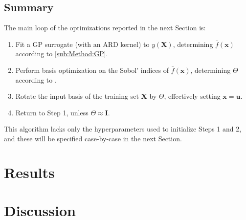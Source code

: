 \documentclass[preprint,12pt]{elsarticle}
\newcommand*{\M}[1]{\ensuremath{#1}\xspace}
\newcommand*{\vr}[1]{\M{\mathbf{#1}}}
\begin{document}
        \subsection{Summary} \label{sub:Method:Summary}
            The main loop of the optimizations reported in the next Section is:
            \begin{enumerate}
                \item Fit a GP surrogate (with an ARD kernel) to $y(\vr{X})$, determining $\bar{f}(\vr{x})$ according to \cref{sub:Method:GP}.
                \item Perform basis optimization on the Sobol' indices of $\bar{f}(\vr{x})$, determining $\Theta$ according to .
                \item Rotate the input basis of the training set $\vr{X}$ by $\Theta$, effectively setting $\vr{x}=\vr{u}$.
                \item Return to Step 1, unless $\Theta \approx \vr{I}$.
            \end{enumerate}
            This algorithm lacks only the hyperparameters used to initialize Steps 1 and 2, and these will be specified case-by-case in the next Section.


    \section{Results} \label{sec:Results}


    \section{Discussion} \label{sec:Discussion}







         
    
\end{document}
